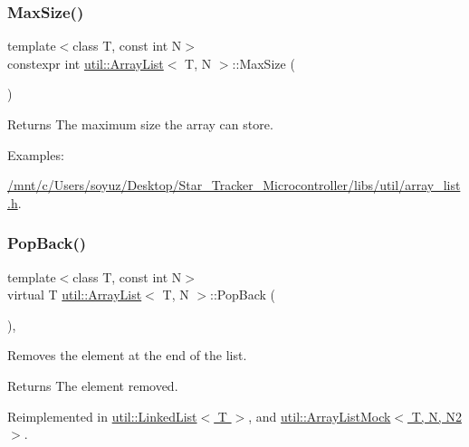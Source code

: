 \subsubsection{\texorpdfstring{Max\+Size()}{MaxSize()}}
{\footnotesize\ttfamily template$<$class T, const int N$>$ \\
constexpr int \hyperlink{classutil_1_1ArrayList}{util\+::\+Array\+List}$<$ T, N $>$\+::Max\+Size (\begin{DoxyParamCaption}{ }\end{DoxyParamCaption})\hspace{0.3cm}{\ttfamily [inline]}}

\begin{DoxyReturn}{Returns}
The maximum size the array can store. 
\end{DoxyReturn}
\begin{Desc}
\item[Examples\+: ]\par
\hyperlink{_2mnt_2c_2Users_2soyuz_2Desktop_2Star_Tracker_Microcontroller_2libs_2util_2array_list_8h-example}{/mnt/c/\+Users/soyuz/\+Desktop/\+Star\+\_\+\+Tracker\+\_\+\+Microcontroller/libs/util/array\+\_\+list.\+h}.\end{Desc}
\mbox{\label{classutil_1_1ArrayList_ac03915c0d58b62bf78148737be86fafc}} 
\subsubsection{\texorpdfstring{Pop\+Back()}{PopBack()}}
{\footnotesize\ttfamily template$<$class T, const int N$>$ \\
virtual T \hyperlink{classutil_1_1ArrayList}{util\+::\+Array\+List}$<$ T, N $>$\+::Pop\+Back (\begin{DoxyParamCaption}{ }\end{DoxyParamCaption})\hspace{0.3cm}{\ttfamily [inline]}, {\ttfamily [virtual]}}



Removes the element at the end of the list. 

\begin{DoxyReturn}{Returns}
The element removed. 
\end{DoxyReturn}


Reimplemented in \hyperlink{classutil_1_1LinkedList_ac7f5e9d19d9886b6b0b22232fc001424}{util\+::\+Linked\+List$<$ T $>$}, and \hyperlink{classutil_1_1ArrayListMock_ac6244094b159f4ab8986bf865afa90ff}{util\+::\+Array\+List\+Mock$<$ T, N, N2 $>$}.

